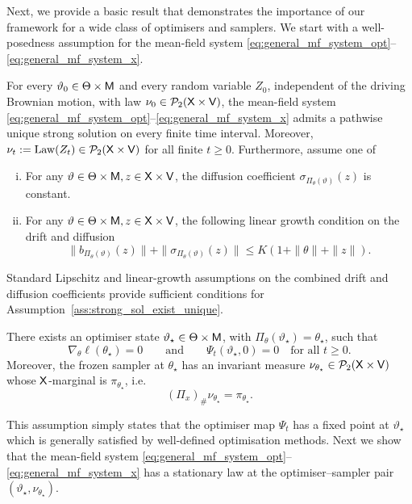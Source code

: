 Next, we provide a basic result that demonstrates the importance of our framework for a wide class of optimisers and samplers. We start with a well-posedness assumption for the mean-field system \eqref{eq:general_mf_system_opt}--\eqref{eq:general_mf_system_x}.
\begin{assumption}\label{ass:strong_sol_exist_unique}
For every $\vartheta_0\in\Theta\times{\mathsf{M}}$ and every random variable $Z_0$, independent of the driving Brownian motion, with law $\nu_0\in\mathcal P_2({\mathsf{X}}\times{\mathsf{V}})$, the mean-field system \eqref{eq:general_mf_system_opt}--\eqref{eq:general_mf_system_x} admits a pathwise unique strong solution on every finite time interval. Moreover, $\nu_t:=\mathrm{Law}(Z_t)\in\mathcal P_2({\mathsf{X}}\times{\mathsf{V}})$ for all finite $t\ge0$. Furthermore, assume one of
\begin{enumerate}[(i)]
    \item For any $\vartheta\in\Theta\times{\mathsf{M}},z\in{\mathsf{X}}\times{\mathsf{V}}$, the diffusion coefficient $\sigma_{\Pi_{\theta}(\vartheta)}(z)$ is constant.
    \item For any $\vartheta\in\Theta\times{\mathsf{M}},z\in{\mathsf{X}}\times{\mathsf{V}}$, the following linear growth condition on the drift and diffusion 
\begin{equation*}
    \| b_{\Pi_\theta(\vartheta)}(z)\|+\|\sigma_{\Pi_\theta(\vartheta)}(z)\|\le K(1+\|\theta\|+\|z\|).
\end{equation*}
\end{enumerate}
\end{assumption}
Standard Lipschitz and linear-growth assumptions on the combined drift and diffusion coefficients provide sufficient conditions for
Assumption~\ref{ass:strong_sol_exist_unique}.
\begin{assumption}\label{ass:existence_minimizer} There exists an optimiser state \(\vartheta_\star\in\Theta\times{\mathsf{M}}\), with \(\Pi_\theta(\vartheta_\star)=\theta_\star\), such that
\[
\nabla_\theta\ell(\theta_\star)=0
\qquad\text{and}\qquad
\Psi_t(\vartheta_\star,0)=0
\quad\text{for all }t\ge0.
\]
Moreover, the frozen sampler at \(\theta_\star\) has an invariant measure \(\nu_{\theta_\star}\in\mathcal P_2({\mathsf{X}}\times{\mathsf{V}})\) whose \({\mathsf{X}}\)-marginal is \(\pi_{\theta_\star}\), i.e.
\[
(\Pi_x)_\#\nu_{\theta_\star}=\pi_{\theta_\star}.
\]
\end{assumption}
This assumption simply states that the optimiser map $\Psi_t$ has a fixed point at $\vartheta_\star$ which is generally satisfied by well-defined optimisation methods. Next we show that the mean-field system \eqref{eq:general_mf_system_opt}--\eqref{eq:general_mf_system_x} has a stationary law at the optimiser--sampler pair $(\vartheta_\star,\nu_{\theta_\star})$.
